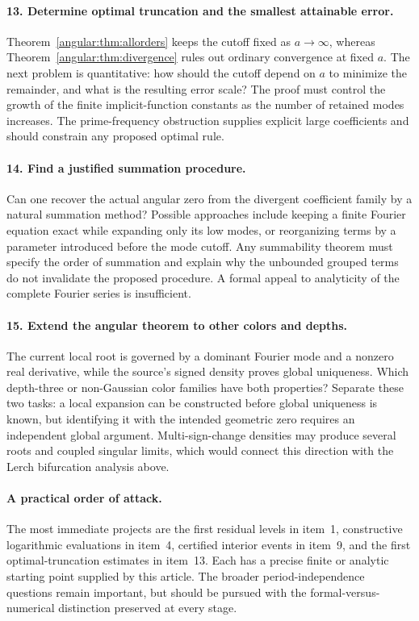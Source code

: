 \paragraph{13. Determine optimal truncation and the smallest attainable error.}
Theorem~\ref{angular:thm:allorders} keeps the cutoff fixed as
$a\to\infty$, whereas Theorem~\ref{angular:thm:divergence} rules out
ordinary convergence at fixed $a$. The next problem is quantitative:
how should the cutoff depend on $a$ to minimize the remainder, and
what is the resulting error scale? The proof must control the growth
of the finite implicit-function constants as the number of retained
modes increases. The prime-frequency obstruction supplies explicit
large coefficients and should constrain any proposed optimal rule.

\paragraph{14. Find a justified summation procedure.}
Can one recover the actual angular zero from the divergent coefficient
family by a natural summation method? Possible approaches include
keeping a finite Fourier equation exact while expanding only its low
modes, or reorganizing terms by a parameter introduced before the
mode cutoff. Any summability theorem must specify the order of
summation and explain why the unbounded grouped terms do not invalidate
the proposed procedure. A formal appeal to analyticity of the complete
Fourier series is insufficient.

\paragraph{15. Extend the angular theorem to other colors and depths.}
The current local root is governed by a dominant Fourier mode and
a nonzero real derivative, while the source's signed density proves
global uniqueness. Which depth-three or non-Gaussian color families
have both properties? Separate these two tasks: a local expansion can
be constructed before global uniqueness is known, but identifying it
with the intended geometric zero requires an independent global
argument. Multi-sign-change densities may produce several roots and
coupled singular limits, which would connect this direction with the
Lerch bifurcation analysis above.

\paragraph{A practical order of attack.}
The most immediate projects are the first residual levels in item~1,
constructive logarithmic evaluations in item~4, certified interior
events in item~9, and the first optimal-truncation estimates in item~13.
Each has a precise finite or analytic starting point supplied by this
article. The broader period-independence questions remain important,
but should be pursued with the formal-versus-numerical distinction
preserved at every stage.
